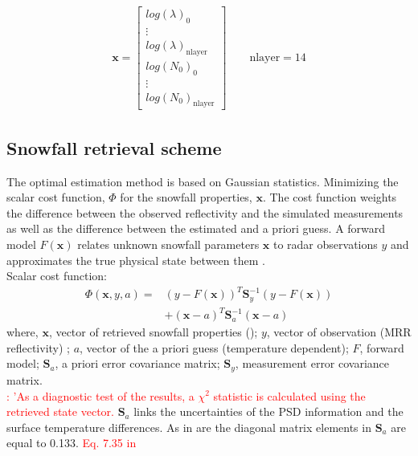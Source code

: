 \begin{align}
\mathbf{x} = \begin{bmatrix}
log(\lambda)_0 	\\
\vdots 			\\
log(\lambda)_{\text{nlayer}} 	\\
log(N_0)_0		\\
\vdots			\\
log(N_0)_{\text{nlayer}}		
\end{bmatrix} \qquad \text{nlayer} = 14
\label{eq:snow_prop}
\end{align}

\subsection{Snowfall retrieval scheme}\label{sec:ret_scheme}
The optimal estimation method is based on Gaussian statistics. Minimizing the scalar cost function, $\Phi$ for the snowfall properties, $\mathbf{x}$. The cost function weights the difference between the observed reflectivity and the simulated measurements as well as the difference between the estimated and a priori guess. A forward model $F(\mathbf{x})$ relates unknown snowfall parameters $\mathbf{x}$ to radar observations $y$ and approximates the true physical state between them \citep{wood_level_2013,cooper_variational_2017}. \\
Scalar cost function:
\begin{equation}
\begin{split}
\Phi(\mathbf{x},y,a) = &(y- F(\mathbf{x}))^T \mathbf{S}_y^{-1} 			(y-F(\mathbf{x})) \\
&+(\mathbf{x}-a)^T \mathbf{S}_{a}^{-1} (\mathbf{x}-a)
\end{split} \label{eq:scalar_cost_fct}
\end{equation}
where, $\mathbf{x}$, vector of retrieved snowfall properties (); $y$, vector of observation (MRR reflectivity) ; $a$, vector of the a priori guess (temperature dependent); $F$, forward model; $\mathbf{S}_a$, a priori error covariance matrix; $\mathbf{S}_y$, measurement error covariance matrix. \\
\textcolor{red}{\cite{wood_level_2013}: 'As a diagnostic test of the results, a $\chi^2$ statistic is calculated using the retrieved state vector.}
$\mathbf{S}_a$ links the uncertainties of the PSD information and the surface temperature differences. As in \cite{wood_estimation_2011} are the diagonal matrix elements in $\mathbf{S}_a$ are equal to \num{0.133}. \textcolor{red}{Eq. 7.35 in \citet{wood_estimation_2011}} \\
